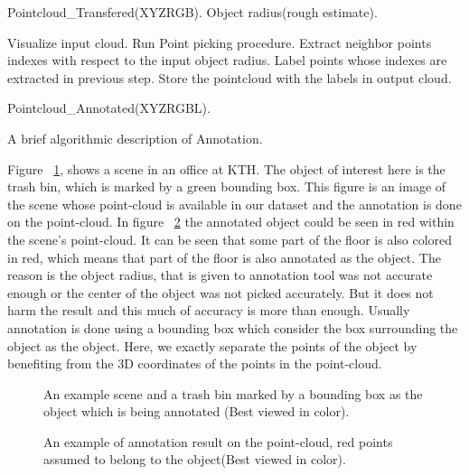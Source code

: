 \begin{algorithm}[t]
\begin{algorithmic}[1]
\REQUIRE Pointcloud\_Transfered(XYZRGB).
\REQUIRE Object radius(rough estimate).
\medskip

\STATE Visualize input cloud.
  \STATE Run Point picking procedure.
  \STATE Extract neighbor points indexes with respect to the input object radius.
  \STATE Label points whose indexes are extracted in previous step.
\ENDFOR
\STATE Store the pointcloud with the labels in output cloud.

\medskip
\ENSURE Pointcloud\_Annotated(XYZRGBL).
\end{algorithmic}
\caption[Annotation.]
{A brief algorithmic description of Annotation.}
\label{Annotation.algorithm}
\end{algorithm}


Figure ~\ref{TrashbinBounding.figure}, shows a scene in an office at KTH. 
The object of interest here is the trash bin, which is marked by a green bounding box. 
This figure is an image of the scene whose point-cloud is available in our dataset and the annotation is done on the point-cloud. 
In figure ~\ref{Annotation.figure} the annotated object could be seen in red within the scene's point-cloud.
It can be seen that some part of the floor is also colored in red, which means that part of the floor is also annotated as the object.
The reason is the object radius, that is given to annotation tool was not accurate enough or the center of the object was not 
picked accurately.
But it does not harm the result and this much of accuracy is more than enough.
Usually annotation is done using a bounding box which consider the box surrounding the object as the object.
Here, we exactly separate the points of the object by benefiting from the 3D coordinates of the points in the point-cloud.

\begin{figure}[t]
  \caption[Example scene and object for Annotation tool]
  {An example scene and a trash bin marked by a bounding box as the object which is being annotated (Best viewed in color).}
  \label{TrashbinBounding.figure}
\end{figure}

\begin{figure}[t]
  \caption[Annotation tool result]
  {An example of annotation result on the point-cloud, red points assumed to belong to the object(Best viewed in color).}
  \label{Annotation.figure}
\end{figure}

